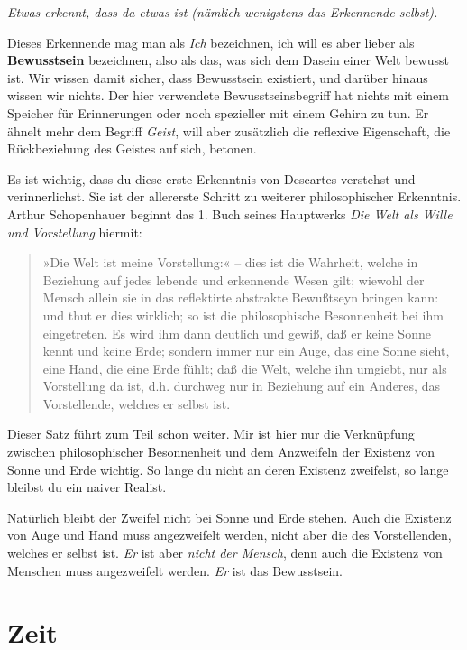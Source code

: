 \documentclass[12pt]{book}
\begin{document}
\emph{Etwas erkennt, dass da etwas ist (nämlich wenigstens das Erkennende selbst).}

Dieses Erkennende mag man als \emph{Ich} bezeichnen, ich will es aber lieber als \textbf{Bewusstsein} bezeichnen, also als das, was sich dem Dasein einer Welt bewusst ist. Wir wissen damit sicher, dass Bewusstsein existiert, und darüber hinaus wissen wir nichts. Der hier verwendete Bewusstseinsbegriff hat nichts mit einem Speicher für Erinnerungen oder noch spezieller mit einem Gehirn zu tun. Er ähnelt mehr dem Begriff \emph{Geist}, will aber zusätzlich die reflexive Eigenschaft, die Rückbeziehung des Geistes auf sich, betonen. 

Es ist wichtig, dass du diese erste Erkenntnis von Descartes verstehst und verinnerlichst. Sie ist der allererste Schritt zu weiterer philosophischer Erkenntnis. Arthur Schopenhauer beginnt das 1. Buch seines Hauptwerks \emph{Die Welt als Wille und Vorstellung} hiermit: 

\begin{quote}\begin{tcolorbox}
»Die Welt ist meine Vorstellung:« – dies ist die Wahrheit, welche in Beziehung auf jedes lebende und erkennende Wesen gilt; wiewohl der Mensch allein sie in das reflektirte abstrakte Bewußtseyn bringen kann: und thut er dies wirklich; so ist die philosophische Besonnenheit bei ihm eingetreten. Es wird ihm dann deutlich und gewiß, daß er keine Sonne kennt und keine Erde; sondern immer nur ein Auge, das eine Sonne sieht, eine Hand, die eine Erde fühlt; daß die Welt, welche ihn umgiebt, nur als Vorstellung da ist, d.h. durchweg nur in Beziehung auf ein Anderes, das Vorstellende, welches er selbst ist.
\end{tcolorbox}\end{quote}

Dieser Satz führt zum Teil schon weiter. Mir ist hier nur die Verknüpfung zwischen philosophischer Besonnenheit und dem Anzweifeln der Existenz von Sonne und Erde wichtig. So lange du nicht an deren Existenz zweifelst, so lange bleibst du ein naiver Realist. 

Natürlich bleibt der Zweifel nicht bei Sonne und Erde stehen. Auch die Existenz von Auge und Hand muss angezweifelt werden, nicht aber die des Vorstellenden, welches er selbst ist. \emph{Er} ist aber \emph{nicht der Mensch}, denn auch die Existenz von Menschen muss angezweifelt werden. \emph{Er} ist das Bewusstsein.

\section{Zeit}
\end{document}
